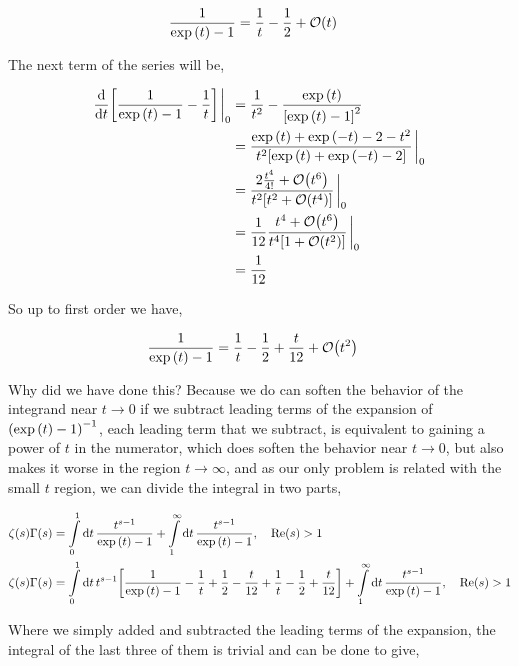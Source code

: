 \begin{align*}
    \frac{1}{\exp\qty(t)-1}&=\frac1t-\frac12+\mathcal O\qty(t)
\end{align*}

The next term of the series will be,

\begin{align*}
    \dv{}{t}\qty[\frac{1}{\exp\qty(t)-1}-\frac1t]\eval_0&=\frac{1}{t^2}-\frac{\exp\qty(t)}{\qty[\exp\qty(t)-1]^2}\\
    &=\frac{\exp\qty(t)+\exp\qty(-t)-2-t^2}{t^2\qty[\exp\qty(t)+\exp\qty(-t)-2]}\eval_0\\
    &=\frac{2\frac{t^4}{4!}+\mathcal O\qty(t^6)}{t^2\qty[t^2+\mathcal O\qty(t^4)]}\eval_0\\
    &=\frac{1}{12}\frac{t^4+\mathcal O\qty(t^6)}{t^4\qty[1+\mathcal O\qty(t^2)]}\eval_0\\
    &=\frac{1}{12}
\end{align*}

So up to first order we have,

\begin{align*}
    \frac{1}{\exp\qty(t)-1}&=\frac1t-\frac12+\frac{t}{12}+\mathcal O\qty(t^2)
\end{align*}

Why did we have done this? Because we do can soften the behavior of the integrand near $t\rightarrow0$ if we 
subtract leading terms of the expansion of $\qty(\exp\qty(t)-1)^{-1}$, each leading term that we subtract, is 
equivalent to gaining a power of $t$ in the numerator, which does soften the behavior near $t\rightarrow 0$, but also 
makes it worse in the region $t\rightarrow\infty$, and as our only problem is related with the small $t$ region, 
we can divide the integral in two parts,

\begin{align*}
    \zeta(s)\Gamma\qty(s)&=\int\limits_0^1\dd{t}\frac{t^{s-1}}{\exp\qty(t)-1}+\int\limits_1^\infty\dd{t}\frac{t^{s-1}}{\exp\qty(t)-1},\ \ \ \textnormal{Re}\qty(s)>1\\
    \zeta(s)\Gamma\qty(s)&=\int\limits_0^1\dd{t}t^{s-1}\qty[\frac{1}{\exp\qty(t)-1}-\frac1t+\frac12-\frac{t}{12}+\frac1t-\frac12+\frac{t}{12}]+\int\limits_1^\infty\dd{t}\frac{t^{s-1}}{\exp\qty(t)-1},\ \ \ \textnormal{Re}\qty(s)>1
\end{align*}

Where we simply added and subtracted the leading terms of the expansion, the integral of the last three of them is 
trivial and can be done to give,

